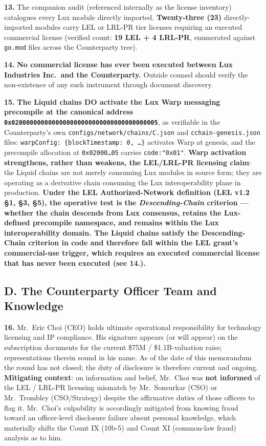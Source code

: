 \documentclass[11pt,letterpaper]{article}
\begin{document}
\textbf{13.} The companion audit (referenced internally as the
license inventory) catalogues every Lux module directly imported.
\textbf{Twenty-three (23)} directly-imported modules carry LEL or LRL-PR tier licenses requiring an executed commercial license (verified count: \textbf{19 LEL + 4 LRL-PR}, enumerated against \texttt{go.mod} files across the Counterparty tree).

\textbf{14.} \textbf{No commercial license has ever been executed
between Lux Industries Inc.\ and the Counterparty.} Outside counsel
should verify the non-existence of any such instrument through
document discovery.

\textbf{15.} \textbf{The Liquid chains DO activate the Lux
Warp messaging precompile at the canonical address
\texttt{0x0200000000000000000000000000000000000005}}, as verifiable
in the Counterparty's own \texttt{configs/network/chains/C.json}
and \texttt{cchain-genesis.json} files: \texttt{warpConfig:
\{blockTimestamp:\,0,\,\dots\}} activates Warp at genesis, and
the precompile allocation at \texttt{0x02000\dots05} carries
\texttt{code:"0x01"}. \textbf{Warp activation strengthens, rather
than weakens, the LEL/LRL-PR licensing claim}: the Liquid chains
are not merely consuming Lux modules in source form; they are
operating as a derivative chain consuming the Lux interoperability
plane in production. \textbf{Under the LEL Authorized-Network
definition (LEL v1.2 \S 1, \S 3, \S 5), the operative test is
the \emph{Descending-Chain} criterion --- whether the chain
descends from Lux consensus, retains the Lux-defined precompile
namespace, and remains within the Lux interoperability domain. The
Liquid chains satisfy the Descending-Chain criterion in code and
therefore fall within the LEL grant's commercial-use trigger,
which requires an executed commercial license that has never been
executed (see \textbf{14.}).}

\subsection*{D. The Counterparty Officer Team and Knowledge}

\textbf{16.} Mr.\ Eric Choi (CEO) holds ultimate operational
responsibility for technology licensing and IP compliance. His
signature appears (or will appear) on the subscription documents for
the current \$75M / \$1.1B-valuation raise; representations therein
sound in his name. As of the date of this memorandum the round has
not closed; the duty of disclosure is therefore current and ongoing.
\textbf{Mitigating context}: on information and belief, Mr.\ Choi
was \textbf{not informed} of the LEL / LRL-PR licensing mismatch by
Mr.\ Sonsurkar (CSO) or Mr.\ Trombley (CSO/Strategy) despite the
affirmative duties of those officers to flag it. Mr.\ Choi's
culpability is accordingly mitigated from knowing fraud toward an
officer-level disclosure failure absent personal knowledge, which
materially shifts the Count IX (10b-5) and Count XI (common-law
fraud) analysis as to him.
\end{document}
